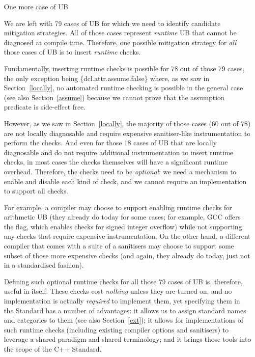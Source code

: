One more case of UB 

We are left with 79
cases of UB for which we need to identify candidate mitigation strategies. All of those cases represent \emph{runtime} UB that cannot be diagnosed at compile time. Therefore, one possible mitigation strategy for \emph{all} those cases of UB is to insert \emph{runtime} checks.

Fundamentally, inserting runtime checks is possible for 78 out of those 79 cases, the only exception being \{dcl.attr.assume.false\} where, as we saw in Section~\ref{locally}, no automated runtime checking is possible in the general case (see also Section~\ref{assume}) because we cannot prove that the assumption predicate is side-effect free.

However, as we saw in Section~\ref{locally}, the majority of those cases (60 out of 78) are not locally diagnosable and require expensive sanitiser-like instrumentation to perform the checks. And even for those 18 cases of UB that are locally diagnosable and do not require additional instrumentation to insert runtime checks, in most cases the checks themselves will have a significant runtime overhead. Therefore, the checks need to be \emph{optional}: we need a mechanism to enable and disable each kind of check, and we cannot require an implementation to support all checks.

For example, a compiler may choose to support enabling runtime checks for arithmetic UB (they already do today for some cases; for example, GCC offers the  flag, which enables checks for signed integer overflow) while not supporting any checks that require expensive instrumentation. On the other hand, a different compiler that comes with a suite of a sanitisers may choose to support some subset of those more expensive checks (and again, they already do today, just not in a standardised fashion).

Defining such optional runtime checks for all those 79 cases of UB is, therefore, useful in itself. These checks cost \emph{nothing} unless they are turned on, and no implementation is actually \emph{required} to implement them, yet specifying them in the Standard has a number of advantages: it allows us to assign standard names and categories to them (see also Section~\ref{ext}); it allows for implementations of such runtime checks (including existing compiler options and sanitisers) to leverage a shared paradigm and shared terminology; and it brings those tools into the scope of the C++ Standard.

